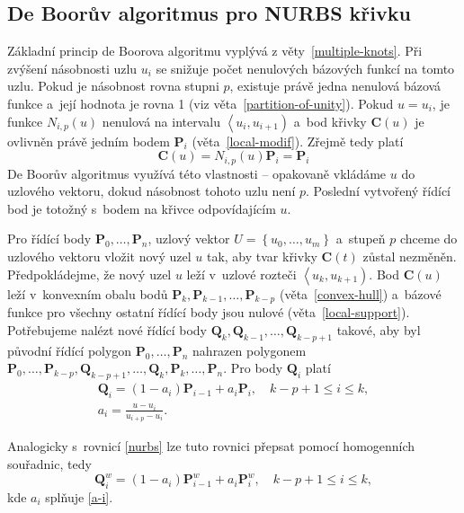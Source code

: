 \subsection{De Boorův algoritmus pro NURBS křivku}\label{deboor-krivka}
Základní princip de Boorova algoritmu vyplývá z věty~\ref{multiple-knots}. Při zvýšení násobnosti uzlu $u_i$ se snižuje počet nenulových bázových funkcí na tomto uzlu. Pokud je násobnost rovna stupni $p$, existuje právě jedna nenulová bázová funkce a~její hodnota je rovna 1 (viz věta~\ref{partition-of-unity}). Pokud $u=u_i$, je funkce $N_{i,p}\left(u\right)$ nenulová na intervalu $\left\langle u_i, u_{i+1}\right)$ a~bod křivky $\mathbf{C}\left(u\right)$ je ovlivněn právě jedním bodem $\mathbf{P}_i$ (věta~\ref{local-modif}). Zřejmě tedy platí 
\begin{equation}\label{DeBoorEndpoint}
\mathbf{C}\left(u\right)=N_{i,p}\left(u\right)\mathbf{P}_i=\mathbf{P}_i
\end{equation}
De Boorův algoritmus využívá této vlastnosti -- opakovaně vkládáme $u$ do uzlového vektoru, dokud násobnost tohoto uzlu není $p$. Poslední vytvořený řídící bod je totožný s~bodem na křivce odpovídajícím $u$.

\sloppy Pro řídící body $\mathbf{P}_0,\dots,\mathbf{P}_n$, uzlový vektor $U=\left\lbrace u_0,\dots,u_m\right\rbrace$ a~stupeň $p$ chceme do uzlového vektoru vložit nový uzel $u$ tak, aby tvar křivky $\mathbf{C}\left(t\right)$ zůstal nezměněn. Předpokládejme, že nový uzel $u$ leží v~uzlové rozteči $\left\langle u_k, u_{k+1}\right)$. Bod $\mathbf{C}\left(u\right)$ leží v~konvexním obalu bodů $\mathbf{P}_k,\mathbf{P}_{k-1},\dots,\mathbf{P}_{k-p}$ (věta~\ref{convex-hull}) a~bázové funkce pro všechny ostatní řídící body jsou nulové (věta~\ref{local-support}). Potřebujeme nalézt nové řídící body $\mathbf{Q}_k,\mathbf{Q}_{k-1},\dots,\mathbf{Q}_{k-p+1}$ takové, aby byl původní řídící polygon $\mathbf{P}_0,\dots,\mathbf{P}_n$ nahrazen polygonem $\mathbf{P}_0,\dots,\mathbf{P}_{k-p},\mathbf{Q}_{k-p+1},\dots,\mathbf{Q}_k,\mathbf{P}_k,\dots,\mathbf{P}_n$. Pro body $\mathbf{Q}_i$ platí
\begin{subequations}
	\begin{gather}
	\mathbf{Q}_i=\left(1-a_i\right)\mathbf{P}_{i-1}+a_i\mathbf{P}_i,\quad k-p+1\leq i\leq k,\\
	a_i=\frac{u-u_i}{u_{i+p}-u_i}.\label{a-i}
	\end{gather}
\end{subequations}

Analogicky s~rovnicí \eqref{nurbs} lze tuto rovnici přepsat pomocí homogenních souřadnic, tedy
\begin{equation}\label{nurbsDeBoor}
\mathbf{Q}^w_i=\left(1-a_i\right)\mathbf{P}^w_{i-1}+a_i\mathbf{P}^w_i,\quad k-p+1\leq i\leq k,
\end{equation}
kde $a_i$ splňuje \eqref{a-i}.

